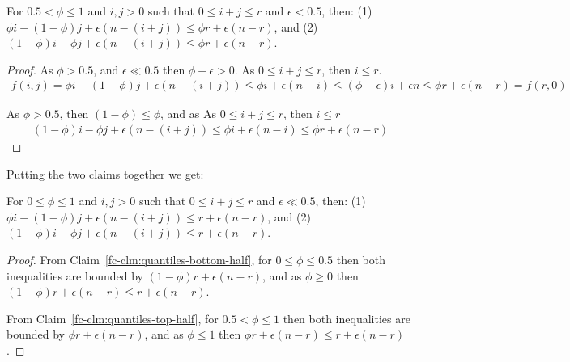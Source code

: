 \begin{claim}
    For $0.5 < \phi \leq 1$ and $i,j>0$ such that $0 \leq i+j \leq r$ and $\epsilon < 0.5$, then: (1) $\phi i - (1-\phi)j + \epsilon(n-(i+j)) \leq \phi r + \epsilon(n-r)$, 
    and (2) $(1-\phi)i - \phi j + \epsilon(n-(i+j)) \leq \phi r + \epsilon(n-r)$.
    \label{fc-clm:quantiles-top-half}
\end{claim}
\begin{proof}
    As $\phi > 0.5$, and $\epsilon \ll 0.5$ then $\phi-\epsilon > 0$. As $0 \leq i+j \leq r$, then $i \leq r$.
    \begin{align}
        f(i,j)=\phi i - (1-\phi)j + \epsilon(n-(i+j)) \leq \phi i +\epsilon (n-i) \leq (\phi - \epsilon)i + \epsilon n \leq \phi r + \epsilon(n-r) = f(r,0)
    \end{align}

    As $\phi > 0.5$, then $(1-\phi) \leq \phi$, and as As $0 \leq i+j \leq r$, then $i \leq r$
    \begin{align}
        (1-\phi)i - \phi j + \epsilon(n-(i+j)) \leq \phi i + \epsilon (n-i) \leq \phi r + \epsilon(n-r)
    \end{align}
\end{proof}

Putting the two claims together we get:

\begin{claim}
    For $0 \leq \phi \leq 1$ and $i,j>0$ such that $0 \leq i+j \leq r$ and $\epsilon \ll 0.5$, then: (1) $\phi i - (1-\phi)j + \epsilon(n-(i+j)) \leq r + \epsilon(n-r)$,
    and (2) $(1-\phi)i - \phi j + \epsilon(n-(i+j)) \leq r + \epsilon(n-r)$.
    \label{fc-clm:helper}
\end{claim}
\begin{proof}
    From Claim~\ref{fc-clm:quantiles-bottom-half}, for $0 \leq \phi \leq 0.5$ then both inequalities are bounded by $(1-\phi) r + \epsilon(n-r)$, and as $\phi \geq 0$ then
    $(1-\phi) r + \epsilon(n-r) \leq r + \epsilon(n-r)$.

    From Claim~\ref{fc-clm:quantiles-top-half}, for $0.5 < \phi \leq 1$ then both inequalities are bounded by $\phi r + \epsilon(n-r)$, and as $\phi \leq 1$ then
    $\phi r + \epsilon(n-r) \leq r + \epsilon(n-r)$.
\end{proof}


